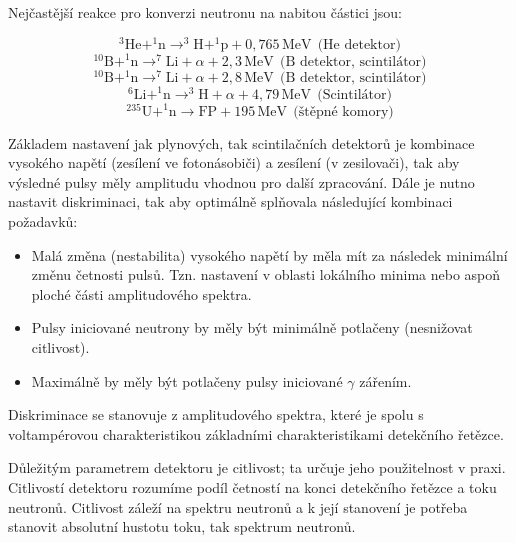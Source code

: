 Nejčastější reakce pro konverzi neutronu na nabitou částici jsou:

\[
^3\text{He} + ^1\text{n} \to ^3\text{H} + ^1\text{p} + 0{,}765 \, \text{MeV} \ \ \text{(He detektor)}
\]
\[
^{10}\text{B} + ^1\text{n} \to ^7\text{Li} + \alpha + 2{,}3 \, \text{MeV} \ \ \text{(B detektor, scintilátor)}
\]
\[
^{10}\text{B} + ^1\text{n} \to ^7\text{Li} + \alpha + 2{,}8 \, \text{MeV} \ \ \text{(B detektor, scintilátor)}
\]
\[
^6\text{Li} + ^1\text{n} \to ^3\text{H} + \alpha + 4{,}79 \, \text{MeV}  \ \ \text{(Scintilátor)}
\]
\[
^{235}\text{U} + ^1\text{n} \to \text{FP} + 195 \, \text{MeV}  \ \ \text{(štěpné komory)}
\]



Základem nastavení jak plynových, tak scintilačních detektorů je kombinace vysokého napětí (zesílení ve fotonásobiči) a zesílení (v zesilovači), tak aby výsledné pulsy měly amplitudu vhodnou pro další zpracování. Dále je nutno nastavit diskriminaci, tak aby optimálně splňovala následující kombinaci požadavků:

\begin{itemize}
    \item Malá změna (nestabilita) vysokého napětí by měla mít za následek minimální změnu četnosti pulsů. Tzn. nastavení v oblasti lokálního minima nebo aspoň ploché části amplitudového spektra.
    \item Pulsy iniciované neutrony by měly být minimálně potlačeny (nesnižovat citlivost).
    \item Maximálně by měly být potlačeny pulsy iniciované $\gamma$ zářením.
\end{itemize}

Diskriminace se stanovuje z amplitudového spektra, které je spolu s voltampérovou charakteristikou základními charakteristikami detekčního řetězce.

Důležitým parametrem detektoru je citlivost; ta určuje jeho použitelnost v praxi. Citlivostí detektoru rozumíme podíl četností na konci detekčního řetězce a toku neutronů. Citlivost záleží na spektru neutronů a k její stanovení je potřeba stanovit absolutní hustotu toku, tak spektrum neutronů. 

